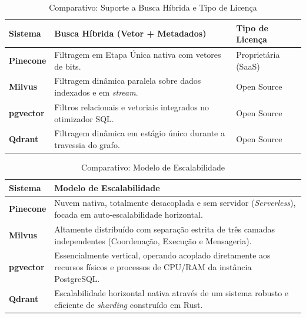 \documentclass[a4paper, 12pt]{article} %
\begin{document}
\begin{table}[H]
\centering
\caption{Comparativo: Suporte a Busca Híbrida e Tipo de Licença}
\label{tab:busca_licenca}
\small
\setlength{\extrarowheight}{3pt}
\begin{tabularx}{\textwidth}{l X l}
\toprule
\textbf{Sistema} & \textbf{Busca Híbrida (Vetor + Metadados)} & \textbf{Tipo de Licença} \\
\midrule
\textbf{Pinecone} & Filtragem em Etapa Única nativa com vetores de bits. & Proprietária (SaaS) \\
\addlinespace
\textbf{Milvus}   & Filtragem dinâmica paralela sobre dados indexados e em \textit{stream}. & Open Source\\
\addlinespace
\textbf{pgvector} & Filtros relacionais e vetoriais integrados no otimizador SQL. & Open Source\\
\addlinespace
\textbf{Qdrant}   & Filtragem dinâmica em estágio único durante a travessia do grafo. & Open Source\\
\bottomrule
\end{tabularx}
\end{table}

\begin{table}[H]
\centering
\caption{Comparativo: Modelo de Escalabilidade}
\label{tab:escalabilidade}
\small
\setlength{\extrarowheight}{4pt}
\begin{tabularx}{\textwidth}{l X}
\toprule
\textbf{Sistema} & \textbf{Modelo de Escalabilidade} \\
\midrule
\textbf{Pinecone} & Nuvem nativa, totalmente desacoplada e sem servidor (\textit{Serverless}), focada em auto-escalabilidade horizontal. \\
\addlinespace
\textbf{Milvus}   & Altamente distribuído com separação estrita de três camadas independentes (Coordenação, Execução e Mensageria). \\
\addlinespace
\textbf{pgvector} & Essencialmente vertical, operando acoplado diretamente aos recursos físicos e processos de CPU/RAM da instância PostgreSQL. \\
\addlinespace
\textbf{Qdrant}   & Escalabilidade horizontal nativa através de um sistema robusto e eficiente de \textit{sharding} construído em Rust. \\
\bottomrule
\end{tabularx}
\end{table}
\end{document}
